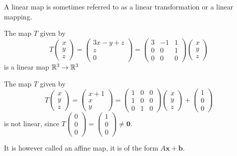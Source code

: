 \documentclass[10pt, a4paper]{article}
\newcommand{\mbf}[1]{\mathbf{#1}}
\begin{document}
A linear map is sometimes referred to as a linear transformation or a linear mapping.

\begin{example}
    The map $T$ given by
    \[
    T\begin{pmatrix}
        x \\ y \\ z
    \end{pmatrix}
    =
    \begin{pmatrix}
        3x - y + z \\ z \\ 0
    \end{pmatrix}
    =
    \begin{pmatrix}
        3 & -1 & 1 \\ 0 & 0 & 1 \\ 0 & 0 & 0
    \end{pmatrix}
    \begin{pmatrix}
        x \\ y \\ z
    \end{pmatrix}
    \]
    is a linear map $\mathbb{R} ^ 3 \rightarrow \mathbb{R} ^ 3$
\end{example}

\begin{example}
    The map $T$ given by
    \[
    T\begin{pmatrix}
        x \\ y \\ z
    \end{pmatrix}
    =
    \begin{pmatrix}
        x + 1 \\ x \\ y
    \end{pmatrix}
    =
    \begin{pmatrix}
        1 & 0 & 0 \\ 1 & 0 & 0 \\ 0 & 1 & 0
    \end{pmatrix}
    \begin{pmatrix}
        x \\ y \\ z
    \end{pmatrix}
    +
    \begin{pmatrix}
        1 \\ 0 \\ 0
    \end{pmatrix}
    \]
    is not linear,
    since $T\begin{pmatrix}
        0 \\ 0 \\ 0
    \end{pmatrix} = \begin{pmatrix}
        1 \\ 0 \\ 0
    \end{pmatrix} \neq \mbf{0}$.

    It is however called an affine map,
    it is of the form $A\mbf{x} + \mbf{b}$.
\end{example}
\end{document}
